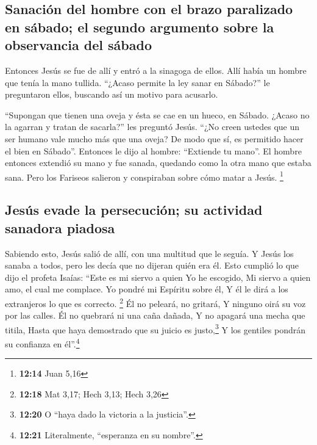 \hypertarget{sanaciuxf3n-del-hombre-con-el-brazo-paralizado-en-suxe1bado-el-segundo-argumento-sobre-la-observancia-del-suxe1bado}{%
\subsection{Sanación del hombre con el brazo paralizado en sábado; el
segundo argumento sobre la observancia del
sábado}\label{sanaciuxf3n-del-hombre-con-el-brazo-paralizado-en-suxe1bado-el-segundo-argumento-sobre-la-observancia-del-suxe1bado}}

 Entonces Jesús se fue de allí y entró a la sinagoga de
ellos.  Allí había un hombre que tenía la mano tullida.
``¿Acaso permite la ley sanar en Sábado?'' le preguntaron ellos,
buscando así un motivo para acusarlo.

 ``Supongan que tienen una oveja y ésta se cae en un
hueco, en Sábado. ¿Acaso no la agarran y tratan de sacarla?'' les
preguntó Jesús.  ``¿No creen ustedes que un ser humano
vale mucho más que una oveja? De modo que sí, es permitido hacer el bien
en Sábado''.  Entonces le dijo al hombre: ``Extiende tu
mano''. El hombre entonces extendió su mano y fue sanada, quedando como
la otra mano que estaba sana.  Pero los Fariseos salieron
y conspiraban sobre cómo matar a Jesús. \footnote{\textbf{12:14} Juan
  5,16}

\hypertarget{jesuxfas-evade-la-persecuciuxf3n-su-actividad-sanadora-piadosa}{%
\subsection{Jesús evade la persecución; su actividad sanadora
piadosa}\label{jesuxfas-evade-la-persecuciuxf3n-su-actividad-sanadora-piadosa}}

 Sabiendo esto, Jesús salió de allí, con una multitud que
le seguía. Y Jesús los sanaba a todos,  pero les decía
que no dijeran quién era él.  Esto cumplió lo que dijo el
profeta Isaías:  ``Este es mi siervo a quien Yo he
escogido, Mi siervo a quien amo, el cual me complace. Yo pondré mi
Espíritu sobre él, Y él le dirá a los extranjeros lo que es correcto.
\footnote{\textbf{12:18} Mat 3,17; Hech 3,13; Hech 3,26} 
Él no peleará, no gritará, Y ninguno oirá su voz por las calles.
 Él no quebrará ni una caña dañada, Y no apagará una
mecha que titila, Hasta que haya demostrado que su juicio es
justo,\footnote{\textbf{12:20} O ``haya dado la victoria a la
  justicia''.}  Y los gentiles pondrán su confianza en
él''.\footnote{\textbf{12:21} Literalmente, ``esperanza en su nombre''.}

